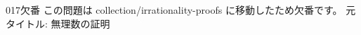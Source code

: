 \begin{prob}{017}{}{欠番}
 この問題は collection/irrationality-proofs に移動したため欠番です。
 元タイトル: 無理数の証明
\end{prob}